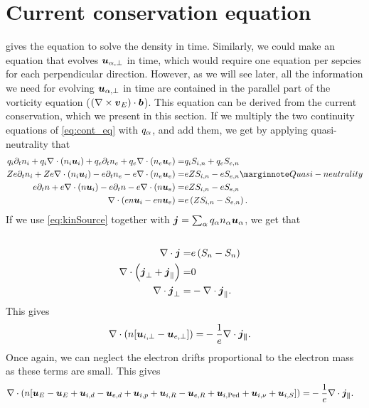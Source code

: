 \section{Current conservation equation}
\label{sec:curConserve}
%
 gives the equation to solve the density in time.
Similarly, we could make an equation that evolves $\boldsymbol{u}_{\alpha,\perp}$ in time, which would require one equation per sepcies for each perpendicular direction.
However, as we will see later, all the information we need for evolving $\boldsymbol{u}_{\alpha,\perp}$ in time are contained in the parallel part of the vorticity equation ($(\nabla\times \boldsymbol{v}_E)\cdot \boldsymbol{b}$).
This equation can be derived from the current conservation, which we present in this section.
If we multiply the two continuity equations of \cref{eq:cont_eq} with $q_\alpha$, and add them, we get by applying quasi-neutrality that
%
\begin{align*}
    q_i\partial_t n_i + q_i\div (n_i \ve{u}_i)
    + q_e\partial_t n_e + q_e\div (n_e \ve{u}_e)
    =&
    q_iS_{i,n} + q_eS_{e,n}
    \\
    Ze\partial_t n_i + Ze\div (n_i \ve{u}_i)
    - e\partial_t n_e - e\div (n_e \ve{u}_e)
    =&
    eZS_{i,n} - eS_{e,n}
    \note{Quasi-neutrality}
    \\
    e\partial_t n + e\div (n \ve{u}_i)
    - e\partial_t n - e\div (n \ve{u}_e)
    =&
    eZS_{i,n} - eS_{e,n}
    \\
    \div (en \ve{u}_i - en \ve{u}_e) =&
    e\L(ZS_{i,n} - S_{e,n}\R).
\end{align*}
%
If we use \cref{eq:kinSource} together with $\boldsymbol{j} = \sum_{\alpha}q_\alpha n_\alpha\boldsymbol{u}_\alpha$, we get that
%
\begin{align*}
    \\
    \nabla\cdot \boldsymbol{j} =&
    e\left(S_{n} - S_{n}\right)
    \\
    \nabla\cdot \left( \boldsymbol{j}_\perp + \boldsymbol{j}_\|\right)=& 0
    \\
    \nabla\cdot \boldsymbol{j}_\perp =& -\nabla\cdot \boldsymbol{j}_\|.
\end{align*}
%
This gives
%
\begin{align*}
    \nabla\cdot \left( n [\boldsymbol{u}_{i,\perp} - \boldsymbol{u}_{e,\perp}] \right) =&
    -\frac{1}{e}\nabla\cdot \boldsymbol{j_\|}.
\end{align*}
%
Once again, we can neglect the electron drifts proportional to the electron mass as these terms are small.
This gives
%
\begin{align}
    \nabla\cdot \left( n [
   \boldsymbol{u}_{E} - \boldsymbol{u}_{E}
  +\boldsymbol{u}_{i,d} - \boldsymbol{u}_{e,d}
  +\boldsymbol{u}_{i,p}
  +\boldsymbol{u}_{i,R} - \boldsymbol{u}_{e,R}
  +\boldsymbol{u}_{i,\text{Ped}}
  +\boldsymbol{u}_{i,\nu}
  +\boldsymbol{u}_{i,S}
  ] \right) =&
  -\frac{1}{e}\nabla\cdot \boldsymbol{j_\|}.
  \label{eq:current_drifts}
\end{align}
